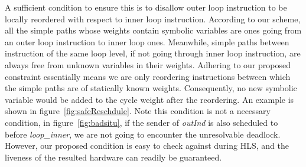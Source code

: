 A sufficient condition to ensure this is to disallow
outer loop instruction to be locally reordered with respect to inner loop instruction.
According to our scheme, all the simple paths whose weights contain symbolic variables are ones going from an outer loop instruction to inner loop ones.
Meanwhile,
simple paths between instruction 
of the same loop level, if not going through inner loop instruction, are 
always free from unknown variables in their weights. Adhering to our proposed constraint
essentially means we are only reordering instructions between which the simple paths are of statically known weights. 
Consequently, no new symbolic variable would be added to the cycle
weight after the reordering. An example is shown in figure~\ref{fig:safeReschdule}. Note this condition is not a necessary condition, in figure~\ref{fig:badsitu}, if the sender of \textit{outInd} is also scheduled to before \textit{loop\_inner}, we are not going to encounter the
unresolvable deadlock. However, our proposed condition is easy to check against during HLS, and the liveness of the resulted hardware can  readily be guaranteed.



